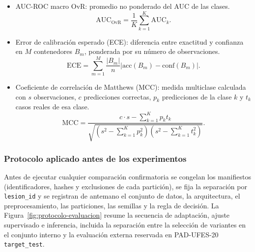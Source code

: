 \begin{itemize}[label={\raisebox{0.15ex}{\rule{0.45ex}{0.45ex}}},leftmargin=1.5em,labelsep=0.6em,itemsep=0.4\baselineskip,topsep=0.3\baselineskip]
\item AUC-ROC macro OvR: promedio no ponderado del AUC de las clases.
\begin{equation}
 \mathrm{AUC}_{\mathrm{OvR}}=\frac{1}{K}\sum_{k=1}^{K}\mathrm{AUC}_k.
\end{equation}

\item Error de calibración esperado (ECE): diferencia entre exactitud y confianza en $M$ contenedores $B_m$, ponderada por su número de observaciones.
\begin{equation}
 \mathrm{ECE}=\sum_{m=1}^{M}\frac{|B_m|}{n}\left|\mathrm{acc}(B_m)-\mathrm{conf}(B_m)\right|.
\end{equation}

\item Coeficiente de correlación de Matthews (MCC): medida multiclase calculada con $s$ observaciones, $c$ predicciones correctas, $p_k$ predicciones de la clase $k$ y $t_k$ casos reales de esa clase.
\begin{equation}
 \mathrm{MCC}=\frac{c\cdot s-\sum_{k=1}^{K}p_k t_k}{\sqrt{\left(s^2-\sum_{k=1}^{K}p_k^2\right)\left(s^2-\sum_{k=1}^{K}t_k^2\right)}}.
\end{equation}
\end{itemize}

\subsubsection{Protocolo aplicado antes de los experimentos}\label{sec:protocolo-estadistico}

Antes de ejecutar cualquier comparación confirmatoria se congelan los manifiestos (identificadores, hashes y exclusiones de cada partición), se fija la separación por \texttt{lesion\_id} y se registran de antemano el conjunto de datos, la arquitectura, el preprocesamiento, las particiones, las semillas y la regla de decisión. La Figura~\ref{fig:protocolo-evaluacion} resume la secuencia de adaptación, ajuste supervisado e inferencia, incluida la separación entre la selección de variantes en el conjunto interno y la evaluación externa reservada en PAD-UFES-20 \texttt{target\_test}.

